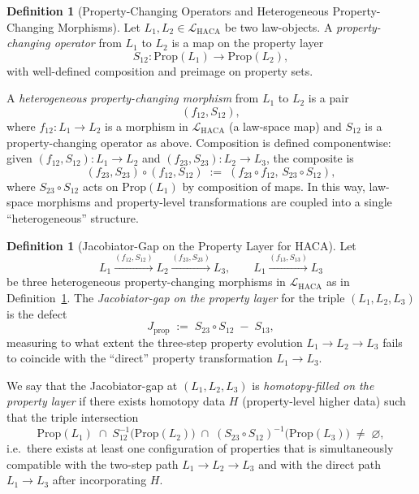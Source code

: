 \documentclass[11pt]{book}
\theoremstyle{plain}
\theoremstyle{definition}
\newtheorem{definition}[theorem]{Definition}
\theoremstyle{remark}
\begin{document}
\begin{definition}[Property-Changing Operators and Heterogeneous Property-Changing Morphisms]
\label{def:property-changing-operators}
Let $L_1,L_2 \in \mathcal{L}_{\mathrm{HACA}}$ be two law-objects. A
\emph{property-changing operator} from $L_1$ to $L_2$ is a map on the
property layer
\[
  S_{12} : \mathrm{Prop}(L_1) \longrightarrow \mathrm{Prop}(L_2),
\]
with well-defined composition and preimage on property sets.

A \emph{heterogeneous property-changing morphism} from $L_1$ to $L_2$ is a
pair
\[
  (f_{12}, S_{12}),
\]
where $f_{12}: L_1 \to L_2$ is a morphism in
$\mathcal{L}_{\mathrm{HACA}}$ (a law-space map) and $S_{12}$ is a
property-changing operator as above. Composition is defined componentwise:
given $(f_{12},S_{12}) : L_1 \to L_2$ and $(f_{23},S_{23}) : L_2 \to L_3$,
the composite is
\[
  (f_{23},S_{23}) \circ (f_{12},S_{12})
  \;:=\;
  (f_{23}\circ f_{12},\, S_{23}\circ S_{12}),
\]
where $S_{23}\circ S_{12}$ acts on $\mathrm{Prop}(L_1)$ by composition of
maps. In this way, law-space morphisms and property-level transformations
are coupled into a single ``heterogeneous'' structure.
\end{definition}



\begin{definition}[Jacobiator-Gap on the Property Layer for HACA]
\label{def:haca-jacobiator-gap-property-layer}
Let
\[
  L_1 \xrightarrow{(f_{12},S_{12})} L_2
      \xrightarrow{(f_{23},S_{23})} L_3,
  \qquad
  L_1 \xrightarrow{(f_{13},S_{13})} L_3
\]
be three heterogeneous property-changing morphisms in
$\mathcal{L}_{\mathrm{HACA}}$ as in
Definition~\ref{def:property-changing-operators}. The
\emph{Jacobiator-gap on the property layer} for the triple
$(L_1,L_2,L_3)$ is the defect
\[
  J_{\mathrm{prop}}
  \;:=\;
  S_{23} \circ S_{12} \;-\; S_{13},
\]
measuring to what extent the three-step property evolution
$L_1 \to L_2 \to L_3$ fails to coincide with the ``direct'' property
transformation $L_1 \to L_3$.

We say that the Jacobiator-gap at $(L_1,L_2,L_3)$ is
\emph{homotopy-filled on the property layer} if there exists homotopy data
$H$ (property-level higher data) such that the triple intersection
\[
  \mathrm{Prop}(L_1)
  \;\cap\;
  S_{12}^{-1}\bigl(\mathrm{Prop}(L_2)\bigr)
  \;\cap\;
  (S_{23}\circ S_{12})^{-1}\bigl(\mathrm{Prop}(L_3)\bigr)
  \;\neq\; \varnothing,
\]
i.e.\ there exists at least one configuration of properties that is
simultaneously compatible with the two-step path
$L_1 \to L_2 \to L_3$ and with the direct path $L_1 \to L_3$ after
incorporating $H$.
\end{definition}
\end{document}
